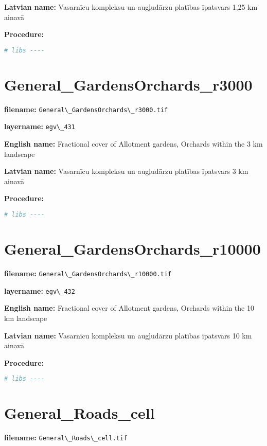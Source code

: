 \documentclass[
]{book}
\newcommand{\passthrough}[1]{#1}
\begin{document}
\textbf{Latvian name:} Vasarnīcu kompleksu un augļudārzu platības īpatsvars 1,25 km ainavā

\textbf{Procedure:}

\begin{lstlisting}[language=R]
# libs ----
\end{lstlisting}

\section{General\_GardensOrchards\_r3000}\label{ch06.431}

\textbf{filename:} \passthrough{\lstinline!General\_GardensOrchards\_r3000.tif!}

\textbf{layername:} \passthrough{\lstinline!egv\_431!}

\textbf{English name:} Fractional cover of Allotment gardens, Orchards within the 3 km landscape

\textbf{Latvian name:} Vasarnīcu kompleksu un augļudārzu platības īpatsvars 3 km ainavā

\textbf{Procedure:}

\begin{lstlisting}[language=R]
# libs ----
\end{lstlisting}

\section{General\_GardensOrchards\_r10000}\label{ch06.432}

\textbf{filename:} \passthrough{\lstinline!General\_GardensOrchards\_r10000.tif!}

\textbf{layername:} \passthrough{\lstinline!egv\_432!}

\textbf{English name:} Fractional cover of Allotment gardens, Orchards within the 10 km landscape

\textbf{Latvian name:} Vasarnīcu kompleksu un augļudārzu platības īpatsvars 10 km ainavā

\textbf{Procedure:}

\begin{lstlisting}[language=R]
# libs ----
\end{lstlisting}

\section{General\_Roads\_cell}\label{ch06.433}

\textbf{filename:} \passthrough{\lstinline!General\_Roads\_cell.tif!}
\end{document}
